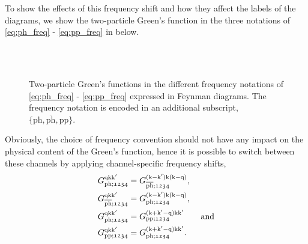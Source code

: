 \documentclass[../../main.tex]{subfiles}
\begin{document}
To show the effects of this frequency shift and how they affect the labels of the diagrams, we show the two-particle Green's function in the three notations of \eqref{eq:ph_freq} - \eqref{eq:pp_freq} in  below.
\begin{figure}[h]
  \centering
  \vspace{0.5cm}\\
  \vspace{0.5cm}\\
  \caption{Two-particle Green's functions in the different frequency notations of \eqref{eq:ph_freq} - \eqref{eq:pp_freq} expressed in Feynman diagrams. The frequency notation is encoded in an additional subscript, $\{\text{ph}, \overline{\text{ph}},\text{pp}\}$.}
  \label{fig:two_particle_green_channels}
\end{figure}
Obviously, the choice of frequency convention should not have any impact on the physical content of the Green's function, hence it is possible to switch between these channels by applying channel-specific frequency shifts,
\begin{subequations}
\begin{align}
	G_{\text{ph};\mathfrak{1234}}^{\text{q}\text{k}\text{k}'}&=G_{\overline{\text{ph}};\mathfrak{1234}}^{(\text{k}-\text{k}')\text{k}(\text{k}-\text{q})},\\
	G_{\overline{\text{ph}};\mathfrak{1234}}^{\text{q}\text{k}\text{k}'}&=G_{\text{ph};\mathfrak{1234}}^{(\text{k}-\text{k}')\text{k}(\text{k}-\text{q})},\\
	G_{\text{ph};\mathfrak{1234}}^{\text{q}\text{k}\text{k}'}&=G_{\text{pp};\mathfrak{1234}}^{(\text{k}+\text{k}'-\text{q})\text{k}\text{k}'}\qquad\text{and}\\
	G_{\text{pp};\mathfrak{1234}}^{\text{q}\text{k}\text{k}'}&=G_{\text{ph};\mathfrak{1234}}^{(\text{k}+\text{k}'-\text{q})\text{k}\text{k}'}.
\end{align}
\end{subequations}
\end{document}
